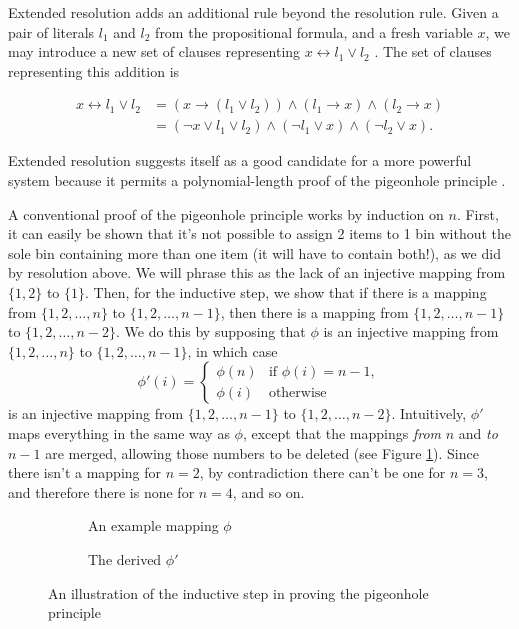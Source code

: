 \documentclass[pdftex,11pt,a4]{article}
\begin{document}

Extended resolution adds an additional rule beyond the resolution rule. Given a pair of literals $l_1$ and $l_2$ from the propositional formula, and a fresh variable $x$, we may introduce a new set of clauses representing $x \leftrightarrow l_1 \vee l_2$ \cite{Tseitin:1983}.
The set of clauses representing this addition is

\begin{equation*}
  \begin{align*}
    x \leftrightarrow l_1 \vee l_2 &= (x \to (l_1 \vee l_2)) \wedge (l_1 \to x) \wedge (l_2 \to x) \\
          &= (\neg x \vee l_1 \vee l_2) \wedge (\neg l_1 \vee x) \wedge (\neg l_2 \vee x).
  \end{align*}
\end{equation*}

Extended resolution suggests itself as a good candidate for a more powerful system because it permits a polynomial-length proof of the pigeonhole principle \cite{Cook:1976}.

A conventional proof of the pigeonhole principle works by induction on $n$. First, it can easily be shown that it's not possible to assign 2 items to 1 bin without the sole bin containing more than one item (it will have to contain both!), as we did by resolution above. We will phrase this as the lack of an injective mapping from $\{1,2\}$ to $\{1\}$. Then, for the inductive step, we show that if there is a mapping from $\{1,2,\ldots,n\}$ to $\{1,2,\ldots,n-1\}$, then there is a mapping from $\{1,2,\ldots,n-1\}$ to $\{1,2,\ldots,n-2\}$. We do this by supposing that $\phi$ is an injective mapping from $\{1,2,\ldots,n\}$ to $\{1,2,\ldots,n-1\}$, in which case
\[\phi'(i) = \begin{cases}
\phi(n) & \mbox{if } \phi(i) = n-1, \\
\phi(i) & \mbox{otherwise}
\end{cases}\]
is an injective mapping from $\{1,2,\ldots,n-1\}$ to $\{1,2,\ldots,n-2\}$. Intuitively, $\phi'$ maps everything in the same way as $\phi$, except that the mappings \emph{from} $n$ and \emph{to} $n-1$ are merged, allowing those numbers to be deleted (see Figure \ref{fig:php-induction}). Since there isn't a mapping for $n=2$, by contradiction there can't be one for $n=3$, and therefore there is none for $n=4$, and so on.

\begin{figure}[h]
  \begin{subfigure}[H]{0.5\textwidth}
    
    \caption{An example mapping $\phi$}
  \end{subfigure}
  \begin{subfigure}[H]{0.5\textwidth}
    
    \caption{The derived $\phi'$}
  \end{subfigure}
  \caption{An illustration of the inductive step in proving the pigeonhole principle}
  \label{fig:php-induction}
\end{figure}
\end{document}
